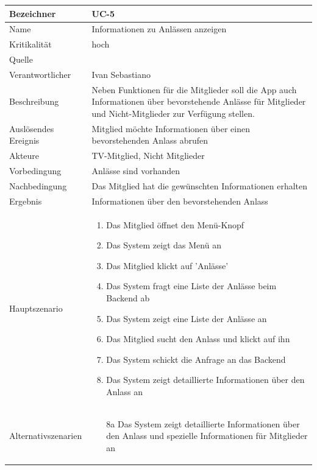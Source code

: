 \begin{table}[ht]
\centering
  \begin{tabular}{ l | p{10cm} }
	\hline
	\rowcolor{gray}
	Bezeichner		&	UC-5\\ \hline
	Name			&	Informationen zu Anlässen anzeigen\\ \hline
	Kritikalität		&	hoch\\ \hline
	Quelle			&	\glossarmark{Stakeholder}\\ \hline
	Verantwortlicher	&	Ivan Sebastiano\\ \hline
	Beschreibung	&	Neben Funktionen für die Mitglieder soll die App auch Informationen über bevorstehende Anlässe für Mitglieder und Nicht-Mitglieder zur Verfügung stellen.\\ \hline
	Auslösendes Ereignis&	Mitglied möchte Informationen über einen bevorstehenden Anlass abrufen\\ \hline
	Akteure		&	TV-Mitglied, Nicht Mitglieder\\ \hline
	Vorbedingung	&	Anlässe sind vorhanden\\ \hline
	Nachbedingung	&	Das Mitglied hat die gewünschten Informationen erhalten\\ \hline
	Ergebnis		&	Informationen über den bevorstehenden Anlass\\ \hline
	Hauptszenario	&	\begin{enumerate}
					\item Das Mitglied öffnet den Menü-Knopf
					\item Das System zeigt das Menü an
					\item Das Mitglied klickt auf 'Anlässe'
					\item Das System fragt eine Liste der Anlässe beim Backend ab
					\item Das System zeigt eine Liste der Anlässe an
					\item Das Mitglied sucht den Anlass und klickt auf ihn
					\item Das System schickt die Anfrage an das Backend
					\item Das System zeigt detaillierte Informationen über den Anlass an
					\end{enumerate}
					\\ \hline
	Alternativszenarien	&	\begin{enumerate}
					\item[8a] Das System zeigt detaillierte Informationen über den Anlass und spezielle Informationen für Mitglieder an
					\end{enumerate}

\end{tabular}
\end{table}
